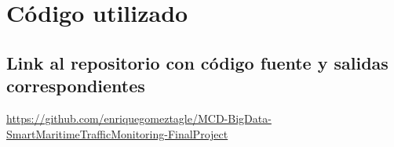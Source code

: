 \documentclass[10pt]{article}
\begin{document}
\section{Código utilizado} %
\subsection{Link al repositorio con código fuente y salidas correspondientes}
\url{https://github.com/enriquegomeztagle/MCD-BigData-SmartMaritimeTrafficMonitoring-FinalProject}
\end{document}

